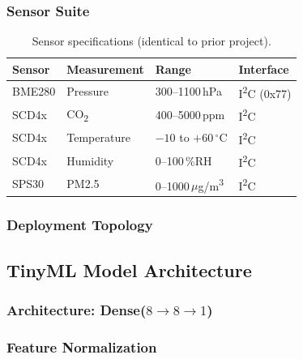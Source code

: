 \documentclass[12pt, a4paper, twoside, openright]{report}
\begin{document}
\subsubsection{Sensor Suite}
\begin{table}[H]
  \centering
  \begin{tabular}{llll}
    \toprule
    \textbf{Sensor} & \textbf{Measurement} & \textbf{Range} & \textbf{Interface} \\
    \midrule
    BME280 & Pressure     & 300--1100\,hPa     & I\textsuperscript{2}C (0x77) \\
    SCD4x  & CO\textsubscript{2} & 400--5000\,ppm & I\textsuperscript{2}C \\
    SCD4x  & Temperature  & $-10$ to $+60\,^{\circ}$C & I\textsuperscript{2}C \\
    SCD4x  & Humidity     & 0--100\,\%RH       & I\textsuperscript{2}C \\
    SPS30  & PM2.5        & 0--1000\,$\mu$g/m\textsuperscript{3} & I\textsuperscript{2}C \\
    \bottomrule
  \end{tabular}
  \caption{Sensor specifications (identical to prior project).}
  \label{tab:sensors}
\end{table}

\subsubsection{Deployment Topology}

\subsection{TinyML Model Architecture}

\subsubsection{Architecture: Dense($8{\to}8{\to}1$)}

\subsubsection{Feature Normalization}
\end{document}
